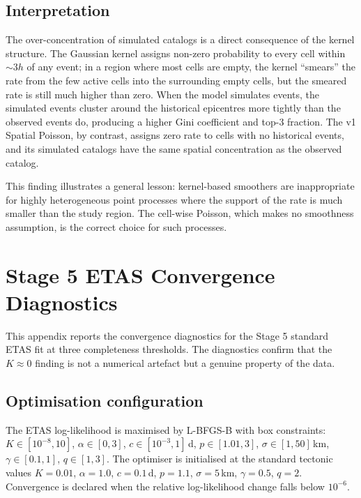 \documentclass[10pt,a4paper,twocolumn]{article}
\begin{document}
\subsection{Interpretation}

The over-concentration of simulated catalogs is a direct consequence of the kernel structure. The Gaussian kernel assigns non-zero probability to every cell within $\sim 3 h$ of any event; in a region where most cells are empty, the kernel ``smears'' the rate from the few active cells into the surrounding empty cells, but the smeared rate is still much higher than zero. When the model simulates events, the simulated events cluster around the historical epicentres more tightly than the observed events do, producing a higher Gini coefficient and top-3 fraction. The v1 Spatial Poisson, by contrast, assigns zero rate to cells with no historical events, and its simulated catalogs have the same spatial concentration as the observed catalog.

This finding illustrates a general lesson: kernel-based smoothers are inappropriate for highly heterogeneous point processes where the support of the rate is much smaller than the study region. The cell-wise Poisson, which makes no smoothness assumption, is the correct choice for such processes.

\section{Stage 5 ETAS Convergence Diagnostics}\label{app:stage5-convergence}

This appendix reports the convergence diagnostics for the Stage 5 standard ETAS fit at three completeness thresholds. The diagnostics confirm that the $K\approx0$ finding is not a numerical artefact but a genuine property of the data.

\subsection{Optimisation configuration}

The ETAS log-likelihood is maximised by L-BFGS-B with box constraints: $K\in[10^{-8}, 10]$, $\alpha\in[0, 3]$, $c\in[10^{-3}, 1]$\,d, $p\in[1.01, 3]$, $\sigma\in[1, 50]$\,km, $\gamma\in[0.1, 1]$, $q\in[1, 3]$. The optimiser is initialised at the standard tectonic values $K=0.01$, $\alpha=1.0$, $c=0.1$\,d, $p=1.1$, $\sigma=5$\,km, $\gamma=0.5$, $q=2$. Convergence is declared when the relative log-likelihood change falls below $10^{-6}$.
\end{document}

